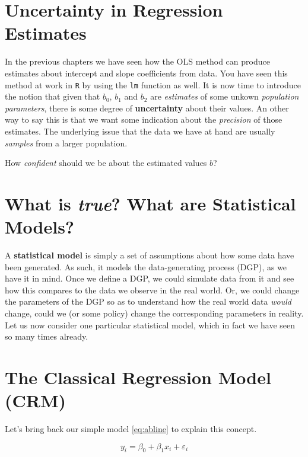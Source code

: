 \documentclass[]{book}
\newenvironment{note}{\begin{tcolorbox}[colback=blue!5!white,colframe=blue!75!black]}{\end{tcolorbox}}
\begin{document}
\section{Uncertainty in Regression
Estimates}\label{uncertainty-in-regression-estimates}

In the previous chapters we have seen how the OLS method can produce
estimates about intercept and slope coefficients from data. You have
seen this method at work in \texttt{R} by using the \texttt{lm} function
as well. It is now time to introduce the notion that given that \(b_0\),
\(b_1\) and \(b_2\) are \emph{estimates} of some unkown \emph{population
parameters}, there is some degree of \textbf{uncertainty} about their
values. An other way to say this is that we want some indication about
the \emph{precision} of those estimates. The underlying issue that the
data we have at hand are usually \emph{samples} from a larger
population.

\begin{note}
How \emph{confident} should we be about the estimated values \(b\)?
\end{note}

\section{\texorpdfstring{What is \emph{true}? What are Statistical
Models?}{What is true? What are Statistical Models?}}\label{what-is-true-what-are-statistical-models}

A \textbf{statistical model} is simply a set of assumptions about how
some data have been generated. As such, it models the data-generating
process (DGP), as we have it in mind. Once we define a DGP, we could
simulate data from it and see how this compares to the data we observe
in the real world. Or, we could change the parameters of the DGP so as
to understand how the real world data \emph{would} change, could we (or
some policy) change the corresponding parameters in reality. Let us now
consider one particular statistical model, which in fact we have seen so
many times already.

\section{The Classical Regression Model (CRM)}\label{class-reg}

Let's bring back our simple model \eqref{eq:abline} to explain this
concept.

\begin{equation}
y_i = \beta_0 + \beta_1 x_i + \varepsilon_i \label{eq:abline-5}
\end{equation}
\end{document}
